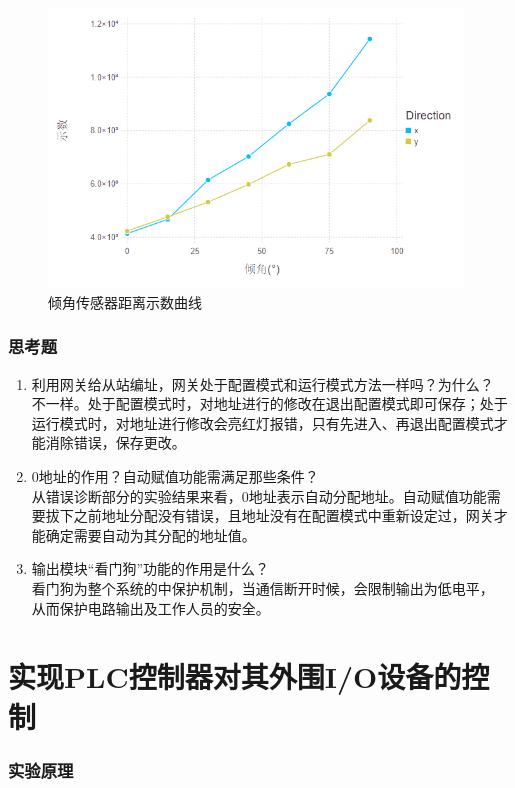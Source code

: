 \begin{figure}[htbp]
\centering
\includegraphics[width=11cm]{resource/dqr.png}
\caption{倾角传感器距离示数曲线}
\label{fig:dqr}
\end{figure}

\section{思考题}
\begin{enumerate}
\item 利用网关给从站编址，网关处于配置模式和运行模式方法一样吗？为什么？\\
不一样。处于配置模式时，对地址进行的修改在退出配置模式即可保存；处于运行模式时，对地址进行修改会亮红灯报错，只有先进入、再退出配置模式才能消除错误，保存更改。
\item 0地址的作用？自动赋值功能需满足那些条件？\\
从错误诊断部分的实验结果来看，0地址表示自动分配地址。自动赋值功能需要拔下之前地址分配没有错误，且地址没有在配置模式中重新设定过，网关才能确定需要自动为其分配的地址值。
\item 输出模块“看门狗”功能的作用是什么？\\
看门狗为整个系统的中保护机制，当通信断开时候，会限制输出为低电平， 从而保护电路输出及工作人员的安全。
\end{enumerate}


\part{实现{\ttfamily PLC}控制器对其外围I/O设备的控制}
\section{实验原理}
